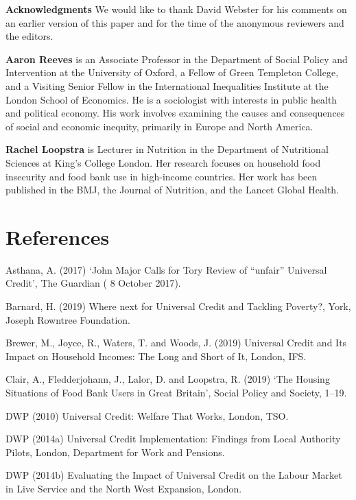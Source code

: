 \documentclass[12pt,article,oneside]{memoir}
\begin{document}
\vspace{1in}


\textbf{Acknowledgments} We would like to thank David Webster for his comments on an earlier version of this paper and for the time of the anonymous reviewers and the editors. 

\vspace{2cm}
\textbf{Aaron Reeves} is an Associate Professor in the Department of Social Policy and Intervention at the University of Oxford, a Fellow of Green Templeton College, and a Visiting Senior Fellow in the International Inequalities Institute at the London School of Economics. He is a sociologist with interests in public health and political economy. His work involves examining the causes and consequences of social and economic inequity, primarily in Europe and North America. 


\textbf{Rachel Loopstra} is Lecturer in Nutrition in the Department of Nutritional Sciences at King's College London. Her research focuses on household food insecurity and food bank use in high-income countries. Her work has been published in the BMJ, the Journal of Nutrition, and the Lancet Global Health.  

\clearpage

\section*{References}

Asthana, A. (2017) ‘John Major Calls for Tory Review of “unfair” Universal Credit’, The Guardian ( 8 October 2017).

Barnard, H. (2019) Where next for Universal Credit and Tackling Poverty?, York, Joseph Rowntree Foundation.

Brewer, M., Joyce, R., Waters, T. and Woods, J. (2019) Universal Credit and Its Impact on Household Incomes: The Long and Short of It, London, IFS.

Clair, A., Fledderjohann, J., Lalor, D. and Loopstra, R. (2019) ‘The Housing Situations of Food Bank Users in Great Britain’, Social Policy and Society, 1–19.

DWP (2010) Universal Credit: Welfare That Works, London, TSO.

DWP (2014a) Universal Credit Implementation: Findings from Local Authority Pilots, London, Department for Work and Pensions.

DWP (2014b) Evaluating the Impact of Universal Credit on the Labour Market in Live Service and the North West Expansion, London.
\end{document}
